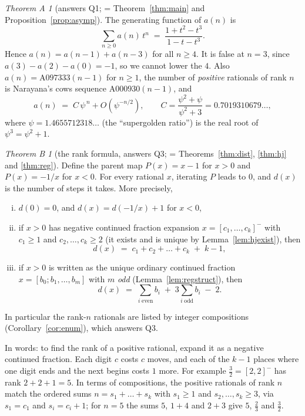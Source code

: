 \documentclass[11pt]{article}
\theoremstyle{definition}
\theoremstyle{remark}
\newtheorem*{thmA}{Theorem A}
\newtheorem*{thmB}{Theorem B}
\newcommand{\hj}[1]{[#1]^{-}}                 %
\begin{document}
\begin{thmA}[answers Q1; = Theorem~\ref{thm:main} and Proposition~\ref{prop:asymp}]
The generating function of $a(n)$ is
\[
\sum_{n\ge0}a(n)\,t^n \;=\; \frac{1+t^2-t^3}{1-t-t^3}.
\]
Hence $a(n)=a(n-1)+a(n-3)$ for all $n\ge4$. It is false at $n=3$, since $a(3)-a(2)-a(0)=-1$, so we
cannot lower the $4$. Also $a(n)=\mathrm{A097333}(n-1)$ for $n\ge1$, the number of
\emph{positive} rationals of rank $n$ is Narayana's cows sequence $\mathrm{A000930}(n-1)$, and
\[
a(n)\;=\;C\,\psi^{\,n}+O\!\left(\psi^{-n/2}\right),\qquad
C=\frac{\psi^2+\psi}{\psi^2+3}=0.7019310679\ldots,
\]
where $\psi=1.4655712318\ldots$ (the ``supergolden ratio'') is the real root of $\psi^3=\psi^2+1$.
\end{thmA}

\begin{thmB}[the rank formula, answers Q3; = Theorems~\ref{thm:dist}, \ref{thm:hj} and \ref{thm:reg}]
Define the parent map $P(x)=x-1$ for $x>0$ and $P(x)=-1/x$ for $x<0$. For every rational $x$,
iterating $P$ leads to $0$, and $d(x)$ is the number of steps it takes. More precisely,
\begin{enumerate}[(i)]
\item $d(0)=0$, and $d(x)=d(-1/x)+1$ for $x<0$,
\item if $x>0$ has negative continued fraction expansion
$x=\hj{c_1,\dots,c_k}$ with $c_1\ge1$ and $c_2,\dots,c_k\ge2$ (it exists and is unique by
Lemma~\ref{lem:hjexist}), then
\[
d(x)\;=\;c_1+c_2+\dots+c_k\;+\;k-1,
\]
\item if $x>0$ is written as the unique ordinary continued fraction $x=[b_0;b_1,\dots,b_m]$ with
$m$ \emph{odd} (Lemma~\ref{lem:regstruct}), then
\[
d(x)\;=\;\sum_{i\;\mathrm{even}} b_i \;+\; 3\sum_{i\;\mathrm{odd}} b_i \;-\;2 .
\]
\end{enumerate}
In particular the rank-$n$ rationals are listed by integer compositions
(Corollary~\ref{cor:enum}), which answers Q3.
\end{thmB}

In words: to find the rank of a positive rational, expand it as a negative continued fraction.
Each digit $c$ costs $c$ moves, and each of the $k-1$ places where one digit ends and the next
begins costs $1$ more. For example $\tfrac32=\hj{2,2}$ has rank $2+2+1=5$. In terms of
compositions, the positive rationals of rank $n$ match the ordered sums $n=s_1+\dots+s_k$ with
$s_1\ge1$ and $s_2,\dots,s_k\ge3$, via $s_1=c_1$ and $s_i=c_i+1$; for $n=5$ the sums $5$, $1+4$ and
$2+3$ give $5$, $\tfrac23$ and $\tfrac32$.
\end{document}

